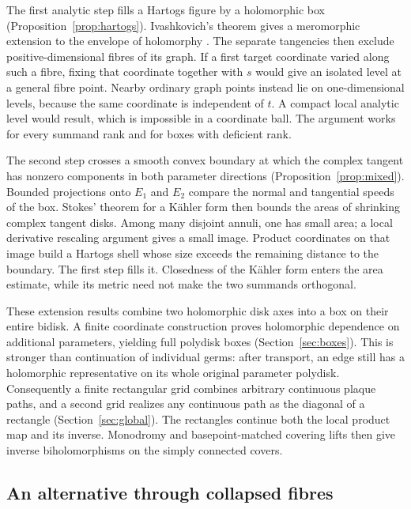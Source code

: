 The first analytic step fills a Hartogs figure by a holomorphic box
(Proposition~\ref{prop:hartogs}). Ivashkovich's theorem gives a
meromorphic extension to the envelope of holomorphy
\cite{Ivashkovich1992,Ivashkovich2008}. The separate tangencies then
exclude positive-dimensional fibres of its graph. If a first target
coordinate varied along such a fibre, fixing that coordinate together
with $s$ would give an isolated level at a general fibre point. Nearby
ordinary graph points instead lie on one-dimensional levels, because
the same coordinate is independent of $t$. A compact local analytic
level would result, which is impossible in a coordinate ball. The
argument works for every summand rank and for boxes with deficient rank.

The second step crosses a smooth convex boundary at which the complex
tangent has nonzero components in both parameter directions
(Proposition~\ref{prop:mixed}). Bounded projections onto $E_1$ and
$E_2$ compare the normal and tangential speeds of the box. Stokes'
theorem for a K\"ahler form then bounds the areas of shrinking complex
tangent disks. Among many disjoint annuli, one has small area; a local
derivative rescaling argument gives a small image. Product coordinates
on that image build a Hartogs shell whose size exceeds the remaining
distance to the boundary. The first step fills it. Closedness of the
K\"ahler form enters the area estimate, while its metric need not make
the two summands orthogonal.

These extension results combine two holomorphic disk axes into a box
on their entire bidisk. A finite coordinate construction proves
holomorphic dependence on additional parameters, yielding full
polydisk boxes (Section~\ref{sec:boxes}). This is stronger than
continuation of individual germs: after transport, an edge still has
a holomorphic representative on its whole original parameter polydisk.
Consequently a finite rectangular grid combines arbitrary continuous
plaque paths, and a second grid realizes any continuous path as the
diagonal of a rectangle (Section~\ref{sec:global}). The rectangles
continue both the local product map and its inverse. Monodromy and
basepoint-matched covering lifts then give inverse biholomorphisms on
the simply connected covers.

\subsection*{An alternative through collapsed fibres}

